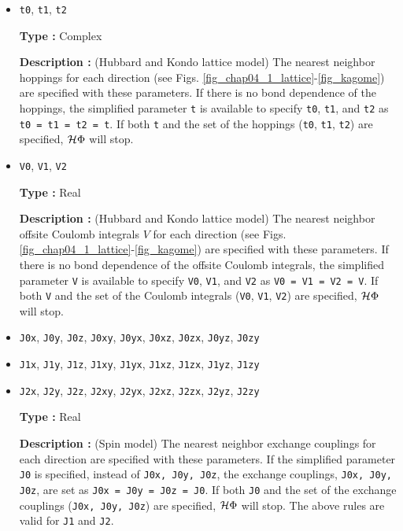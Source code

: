 \begin{itemize}
\item \verb|t0|,  \verb|t1|, \verb|t2|

{\bf Type :} Complex

{\bf Description :} (Hubbard and Kondo lattice model)
The nearest neighbor hoppings for each direction
(see Figs. \ref{fig_chap04_1_lattice}-\ref{fig_kagome})
are specified with these parameters.
If there is no bond dependence of the hoppings,
the simplified parameter \verb|t| is available to specify \verb|t0|,  \verb|t1|, and \verb|t2| as
\verb|t0 = t1 = t2 = t|.
If both \verb|t| and the set of the hoppings (\verb|t0|, \verb|t1|, \verb|t2|) are specified,
$\mathcal{H} \Phi$ will stop.

\item \verb|V0|,  \verb|V1|, \verb|V2|

{\bf Type :} Real

{\bf Description :} (Hubbard and Kondo lattice model)
The nearest neighbor offsite Coulomb integrals $V$
 for each direction
(see Figs. \ref{fig_chap04_1_lattice}-\ref{fig_kagome})
are specified with these parameters.
If there is no bond dependence of the offsite Coulomb integrals,
the simplified parameter \verb|V| is available to specify \verb|V0|,  \verb|V1|, and \verb|V2| as
\verb|V0 = V1 = V2 = V|.
If both \verb|V| and the set of the Coulomb integrals (\verb|V0|,  \verb|V1|, \verb|V2|) are specified,
$\mathcal{H} \Phi$ will stop.

\item \verb|J0x|, \verb|J0y|, \verb|J0z|, \verb|J0xy|, 
  \verb|J0yx|, \verb|J0xz|, \verb|J0zx|, \verb|J0yz|, \verb|J0zy|
\item \verb|J1x|, \verb|J1y|, \verb|J1z|, \verb|J1xy|, 
  \verb|J1yx|, \verb|J1xz|, \verb|J1zx|, \verb|J1yz|, \verb|J1zy|
\item \verb|J2x|, \verb|J2y|, \verb|J2z|, \verb|J2xy|, 
  \verb|J2yx|, \verb|J2xz|, \verb|J2zx|, \verb|J2yz|, \verb|J2zy|

{\bf Type :} Real

{\bf Description :} (Spin model)
The nearest neighbor exchange couplings for each direction
are specified with these parameters.
If the simplified parameter \verb|J0| is specified, instead of \verb|J0x, J0y, J0z|,
the exchange couplings, \verb|J0x, J0y, J0z|, are set as \verb|J0x = J0y = J0z = J0|.
If both \verb|J0| and the set of the exchange couplings (\verb|J0x, J0y, J0z|)
are specified, $\mathcal{H} \Phi$ will stop.
The above rules are valid for \verb|J1| and \verb|J2|.


\end{itemize}
